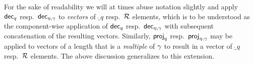 %
%   
% 
%
For the sake of readability we will at times abuse notation slightly and apply $\mathsf{dec}_{q}$ resp.\ $\mathsf{dec}_{\eta,\gamma}$ to \emph{vectors} of $\ring_q$ resp.\ $\mathcal{R}$ elements, which is to be understood as the component-wise application of $\mathsf{dec}_{q}$ resp.\ $\mathsf{dec}_{\eta,\gamma}$ with subsequent concatenation of the resulting vectors.
Similarly, $\mathsf{proj}_{q}$ resp.\ $\mathsf{proj}_{\eta,\gamma}$ may be applied to vectors of a length that is a \emph{multiple} of $\gamma$ to result in a vector of $\ring_q$ resp.\ $\mathcal{R}$ elements.
The above discussion generalizes to this extension.


